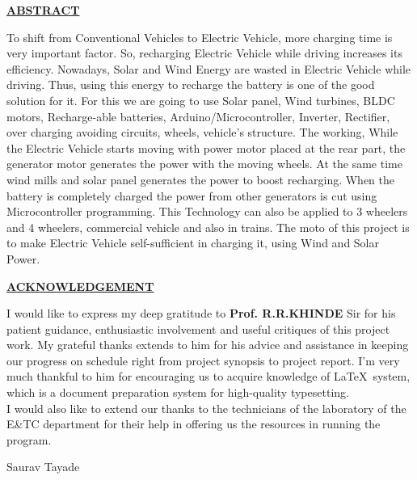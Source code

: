 \documentclass[a4paper,12pt]{article}
\begin{document}
\newpage
\begin{center}
\textbf{\LARGE\scshape\underline{ABSTRACT}}\\[2cm]
\end{center}
\large To shift from Conventional Vehicles to Electric Vehicle, more charging time
is very important factor. So, recharging Electric Vehicle while driving
increases its efficiency. Nowadays, Solar and Wind Energy are wasted in
Electric Vehicle while driving. Thus, using this energy to recharge the
battery is one of the good solution for it. For this we are going to use Solar
panel, Wind turbines, BLDC motors, Recharge-able batteries,
Arduino/Microcontroller, Inverter, Rectifier, over charging avoiding circuits,
wheels, vehicle’s structure. The working, While the Electric Vehicle starts
moving with power motor placed at the rear part, the generator motor
generates the power with the moving wheels. At the same time wind mills
and solar panel generates the power to boost recharging. When the battery is
completely charged the power from other generators is cut using
Microcontroller programming. This Technology can also be applied to 3
wheelers and 4 wheelers, commercial vehicle and also in trains. The moto of
this project is to make Electric Vehicle self-sufficient in charging it, using
Wind and Solar Power.

\newpage
\begin{center}
\textbf{\LARGE\scshape\underline{ACKNOWLEDGEMENT}}\\[2cm]
\end{center}
\large I would like to express my deep gratitude to \textbf{Prof. R.R.KHINDE} Sir for his  patient guidance, enthusiastic involvement and useful critiques of this project work. My grateful thanks extends to him for his advice and assistance in keeping our progress on schedule right from project synopsis to project report. I'm very much thankful to him for encouraging us to acquire knowledge of \LaTeX \ system, which is a document preparation system for high-quality typesetting.\\

\large I would also like to extend our thanks to the technicians of the laboratory of the E\&TC department for their help in offering us the resources in running the program.\\

\vspace{4cm}
\begin{flushright}
Saurav Tayade\\

\end{flushright}
\end{document}
